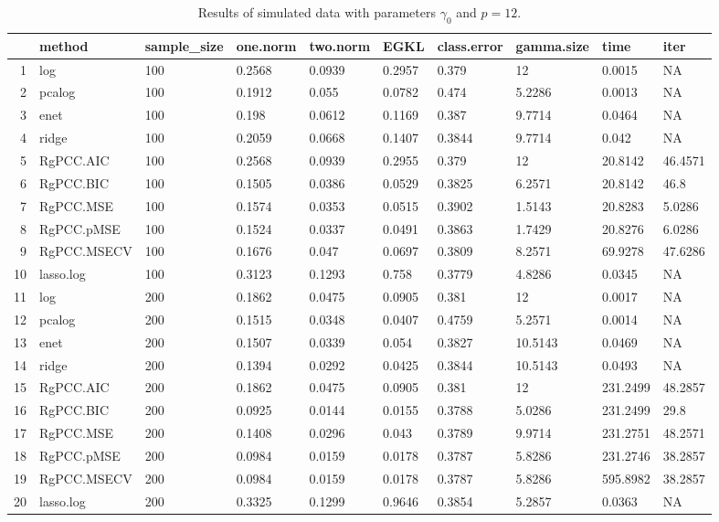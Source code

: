 \begin{table}[ht]
\centering
\begin{tabular}{rlllllllll}
  \hline
 & method & sample\_size & one.norm & two.norm & EGKL & class.error & gamma.size & time & iter \\ 
  \hline
1 & log & 100 & 0.2568 & 0.0939 & 0.2957 & 0.379 & 12 & 0.0015 & NA \\ 
  2 & pcalog & 100 & 0.1912 & 0.055 & 0.0782 & 0.474 & 5.2286 & 0.0013 & NA \\ 
  3 & enet & 100 & 0.198 & 0.0612 & 0.1169 & 0.387 & 9.7714 & 0.0464 & NA \\ 
  4 & ridge & 100 & 0.2059 & 0.0668 & 0.1407 & 0.3844 & 9.7714 & 0.042 & NA \\ 
  5 & RgPCC.AIC & 100 & 0.2568 & 0.0939 & 0.2955 & 0.379 & 12 & 20.8142 & 46.4571 \\ 
  6 & RgPCC.BIC & 100 & 0.1505 & 0.0386 & 0.0529 & 0.3825 & 6.2571 & 20.8142 & 46.8 \\ 
  7 & RgPCC.MSE & 100 & 0.1574 & 0.0353 & 0.0515 & 0.3902 & 1.5143 & 20.8283 & 5.0286 \\ 
  8 & RgPCC.pMSE & 100 & 0.1524 & 0.0337 & 0.0491 & 0.3863 & 1.7429 & 20.8276 & 6.0286 \\ 
  9 & RgPCC.MSECV & 100 & 0.1676 & 0.047 & 0.0697 & 0.3809 & 8.2571 & 69.9278 & 47.6286 \\ 
  10 & lasso.log & 100 & 0.3123 & 0.1293 & 0.758 & 0.3779 & 4.8286 & 0.0345 & NA \\ 
  11 & log & 200 & 0.1862 & 0.0475 & 0.0905 & 0.381 & 12 & 0.0017 & NA \\ 
  12 & pcalog & 200 & 0.1515 & 0.0348 & 0.0407 & 0.4759 & 5.2571 & 0.0014 & NA \\ 
  13 & enet & 200 & 0.1507 & 0.0339 & 0.054 & 0.3827 & 10.5143 & 0.0469 & NA \\ 
  14 & ridge & 200 & 0.1394 & 0.0292 & 0.0425 & 0.3844 & 10.5143 & 0.0493 & NA \\ 
  15 & RgPCC.AIC & 200 & 0.1862 & 0.0475 & 0.0905 & 0.381 & 12 & 231.2499 & 48.2857 \\ 
  16 & RgPCC.BIC & 200 & 0.0925 & 0.0144 & 0.0155 & 0.3788 & 5.0286 & 231.2499 & 29.8 \\ 
  17 & RgPCC.MSE & 200 & 0.1408 & 0.0296 & 0.043 & 0.3789 & 9.9714 & 231.2751 & 48.2571 \\ 
  18 & RgPCC.pMSE & 200 & 0.0984 & 0.0159 & 0.0178 & 0.3787 & 5.8286 & 231.2746 & 38.2857 \\ 
  19 & RgPCC.MSECV & 200 & 0.0984 & 0.0159 & 0.0178 & 0.3787 & 5.8286 & 595.8982 & 38.2857 \\ 
  20 & lasso.log & 200 & 0.3325 & 0.1299 & 0.9646 & 0.3854 & 5.2857 & 0.0363 & NA \\ 
   \hline
\end{tabular}
\caption{Results of simulated data with parameters $\gamma_0$ and $p =12$. } 
\label{fig-0-script-1-12-metrics-p}
\end{table}
